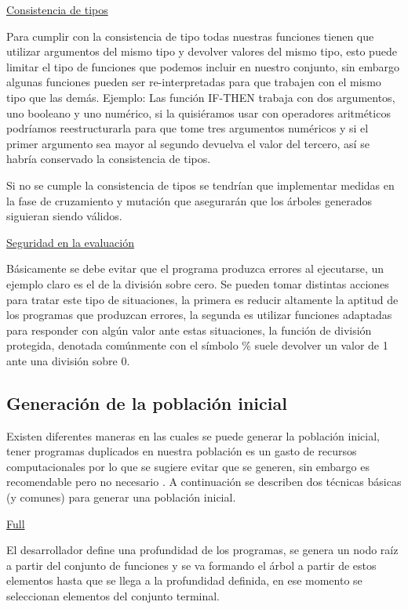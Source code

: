 \documentclass[11pt,fleqn]{book} %
\begin{document}
\underline{Consistencia de tipos}

Para cumplir con la consistencia de tipo todas nuestras funciones tienen que utilizar argumentos del mismo tipo y devolver valores del mismo tipo, esto puede limitar el tipo de funciones que podemos incluir en nuestro conjunto, sin embargo algunas funciones pueden ser re-interpretadas para que trabajen con el mismo tipo que las demás. Ejemplo: Las función IF-THEN trabaja con dos argumentos, uno booleano y uno numérico, si la quisiéramos usar con operadores aritméticos podríamos reestructurarla para que tome tres argumentos numéricos y si el primer argumento sea mayor al segundo devuelva el valor del tercero, así se habría conservado la consistencia de tipos.

Si no se cumple la consistencia de tipos se tendrían que implementar medidas en la fase de cruzamiento y mutación que asegurarán que los árboles generados siguieran siendo válidos.

\underline{Seguridad en la evaluación}

Básicamente se debe evitar que el programa produzca errores al ejecutarse, un ejemplo claro es el de la división sobre cero. Se pueden tomar distintas acciones para tratar este tipo de situaciones, la primera es reducir altamente la aptitud de los programas que produzcan errores, la segunda es utilizar funciones adaptadas para responder con algún valor ante estas situaciones, la función de división protegida, denotada comúnmente con el símbolo \% suele devolver un valor de 1 ante una división sobre 0.

\subsection{Generación de la población inicial} 

Existen diferentes maneras en las cuales se puede generar la población inicial, tener programas duplicados en nuestra población es un gasto de recursos computacionales por lo que se sugiere evitar que se generen, sin embargo es recomendable pero no necesario \cite{koza1992genetic}. A continuación se describen dos técnicas básicas (y comunes) para generar una población inicial.

\clearpage
\underline{Full}

El desarrollador define una profundidad de los programas, se genera un nodo raíz a partir del conjunto de funciones y se va formando el árbol a partir de estos elementos hasta que se llega a la profundidad definida, en ese momento se seleccionan elementos del conjunto terminal.
\end{document}
